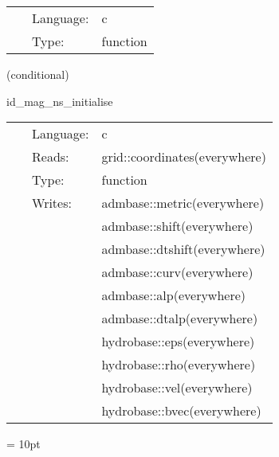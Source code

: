 \hspace{5mm}{\it check parameters } 


\hspace{5mm}

 \begin{tabular*}{160mm}{cll} 
~ & Language:  & c \\ 
~ & Type:  & function \\ 
\end{tabular*} 


\vspace{5mm}

   (conditional) 

\hspace{5mm} id\_mag\_ns\_initialise 

\hspace{5mm}{\it set up magnetised neutron star initial data } 


\hspace{5mm}

 \begin{tabular*}{160mm}{cll} 
~ & Language:  & c \\ 
~ & Reads:  & grid::coordinates(everywhere) \\ 
~ & Type:  & function \\ 
~ & Writes:  & admbase::metric(everywhere) \\ 
~& ~ &admbase::shift(everywhere)\\ 
~& ~ &admbase::dtshift(everywhere)\\ 
~& ~ &admbase::curv(everywhere)\\ 
~& ~ &admbase::alp(everywhere)\\ 
~& ~ &admbase::dtalp(everywhere)\\ 
~& ~ &hydrobase::eps(everywhere)\\ 
~& ~ &hydrobase::rho(everywhere)\\ 
~& ~ &hydrobase::vel(everywhere)\\ 
~& ~ &hydrobase::bvec(everywhere)\\ 
\end{tabular*} 



\vspace{5mm}\parskip = 10pt 

